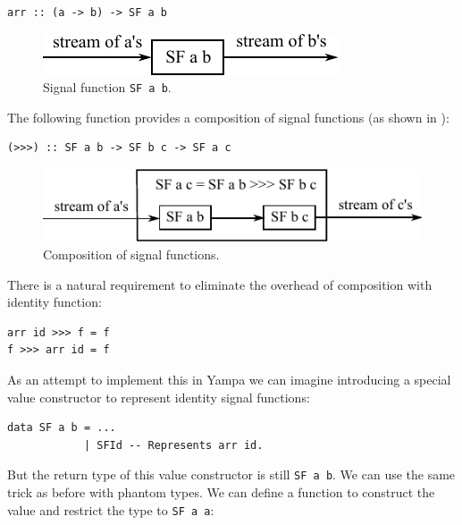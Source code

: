 \documentclass{tmr}
\begin{document}
\begin{Verbatim}
arr :: (a -> b) -> SF a b
\end{Verbatim}

\begin{figure}
\centering
\includegraphics{signal_function}
\vspace{5pt}
\caption{Signal function \texttt{SF a b}.}
\label{fig:signal_function}
\end{figure}

The following function provides a composition of signal functions (as shown in ):

\begin{Verbatim}
(>>>) :: SF a b -> SF b c -> SF a c
\end{Verbatim}

\begin{figure}
\centering
\includegraphics{signal_composition}
\caption{Composition of signal functions.}
\label{fig:signal_composition}
\vspace{5pt}
\end{figure}

There is a natural requirement to eliminate the overhead of composition with identity function:

\begin{Verbatim}
arr id >>> f = f
f >>> arr id = f
\end{Verbatim}

As an attempt to implement this in Yampa we can imagine introducing a special value constructor to represent identity signal functions:

\begin{Verbatim}
data SF a b = ...
            | SFId -- Represents arr id.
\end{Verbatim}

But the return type of this value constructor is still \verb|SF a b|. We can use the same trick as before with phantom types. We can define a function to construct the value and restrict the type to \verb|SF a a|:
\end{document}
